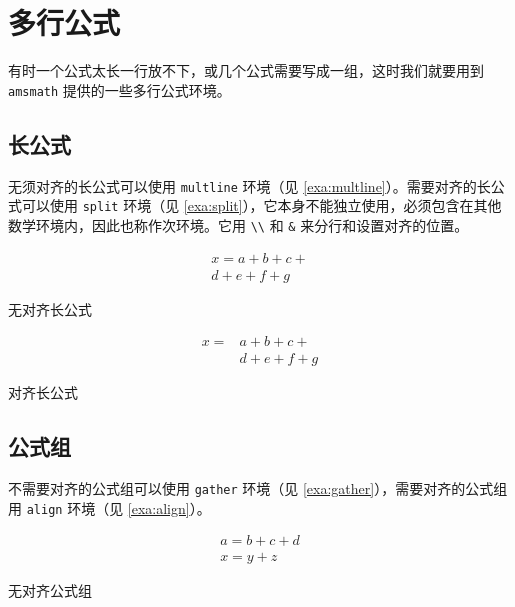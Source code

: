 \section{多行公式}

有时一个公式太长一行放不下，或几个公式需要写成一组，这时我们就要用到 \texttt{amsmath} 提供的一些多行公式环境。

\subsection{长公式}
\label{sec:longeq}

无须对齐的长公式可以使用 \texttt{multline} 环境（见 \autoref{exa:multline}）。需要对齐的长公式可以使用 \texttt{split} 环境（见 \autoref{exa:split}），它本身不能独立使用，必须包含在其他数学环境内，因此也称作次环境。它用 \verb|\\| 和 \verb|&| 来分行和设置对齐的位置。

\begin{example}[htbp]
\begin{RLDemo}[]
\begin{multline}
x = a+b+c+{} \\
  d+e+f+g
\end{multline}
\end{RLDemo}
\caption{无对齐长公式}
\label{exa:multline}
\end{example}

\begin{example}[htbp]
\begin{RLDemo}[]
\[ \begin{split}
x ={} &a+b+c+{} \\
      &d+e+f+g
\end{split} \]
\end{RLDemo}
\caption{对齐长公式}
\label{exa:split}
\end{example}

\subsection{公式组}

不需要对齐的公式组可以使用 \texttt{gather} 环境（见 \autoref{exa:gather}），需要对齐的公式组用 \texttt{align} 环境（见 \autoref{exa:align}）。

\begin{example}[htbp]
\begin{RLDemo}[]
\begin{gather}
a = b+c+d \\
x = y+z
\end{gather}
\end{RLDemo}
\caption{无对齐公式组}
\label{exa:gather}
\end{example}

